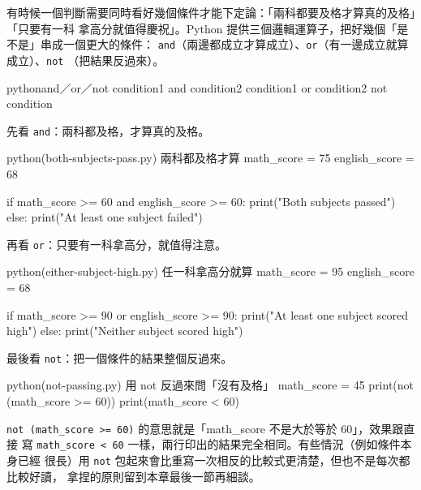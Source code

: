 有時候一個判斷需要同時看好幾個條件才能下定論：「兩科都要及格才算真的及格」「只要有一科
拿高分就值得慶祝」。Python 提供三個邏輯運算子，把好幾個「是不是」串成一個更大的條件：
\texttt{and}（兩邊都成立才算成立）、\texttt{or}（有一邊成立就算成立）、\texttt{not}
（把結果反過來）。

\begin{code}{python}{and／or／not}
condition1 and condition2
condition1 or condition2
not condition
\end{code}

先看 \texttt{and}：兩科都及格，才算真的及格。

\begin{example}{python}{(both-subjects-pass.py) 兩科都及格才算}
math_score = 75
english_score = 68

if math_score >= 60 and english_score >= 60:
    print("Both subjects passed")
else:
    print("At least one subject failed")
\end{example}


再看 \texttt{or}：只要有一科拿高分，就值得注意。

\begin{example}{python}{(either-subject-high.py) 任一科拿高分就算}
math_score = 95
english_score = 68

if math_score >= 90 or english_score >= 90:
    print("At least one subject scored high")
else:
    print("Neither subject scored high")
\end{example}


最後看 \texttt{not}：把一個條件的結果整個反過來。

\begin{example}{python}{(not-passing.py) 用 not 反過來問「沒有及格」}
math_score = 45
print(not (math_score >= 60))
print(math_score < 60)
\end{example}


\texttt{not (math\_score >= 60)} 的意思就是「math\_score 不是大於等於 60」，效果跟直接
寫 \texttt{math\_score < 60} 一樣，兩行印出的結果完全相同。有些情況（例如條件本身已經
很長）用 \texttt{not} 包起來會比重寫一次相反的比較式更清楚，但也不是每次都比較好讀，
拿捏的原則留到本章最後一節再細談。

